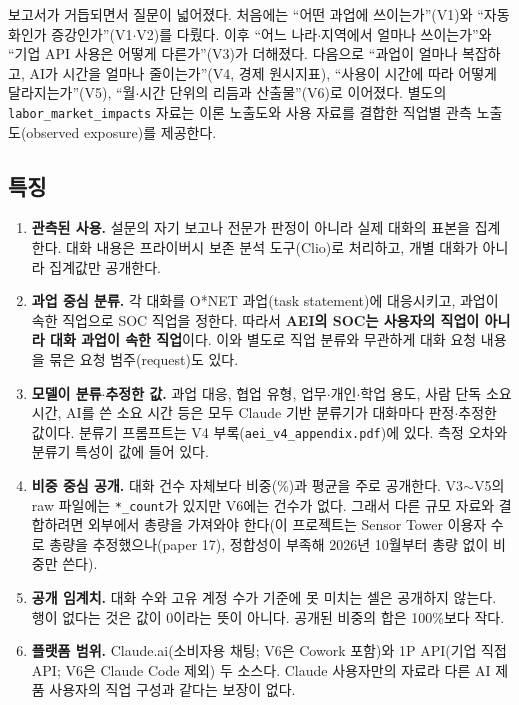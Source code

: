 \documentclass[11pt]{article}
\begin{document}
보고서가 거듭되면서 질문이 넓어졌다. 처음에는 ``어떤 과업에 쓰이는가''(V1)와 ``자동화인가 증강인가''(V1$\cdot$V2)를 다뤘다. 이후 ``어느 나라$\cdot$지역에서 얼마나 쓰이는가''와 ``기업 API 사용은 어떻게 다른가''(V3)\parencite{appel-2025-uneven-geographic-and-enterprise-ai}가 더해졌다. 다음으로 ``과업이 얼마나 복잡하고, AI가 시간을 얼마나 줄이는가''(V4, 경제 원시지표)\parencite{appel-2026-economic-primitives}, ``사용이 시간에 따라 어떻게 달라지는가''(V5)\parencite{massenkoff-2026-learning-curves}, ``월$\cdot$시간 단위의 리듬과 산출물''(V6)\parencite{massenkoff-2026-cadences}로 이어졌다. 별도의 \texttt{labor\_market\_impacts} 자료는 이론 노출도와 사용 자료를 결합한 직업별 관측 노출도(observed exposure)를 제공한다\parencite{massenkoff-2026-labor-market-impacts-of-ai}.

\subsection{특징}

\begin{enumerate}[leftmargin=*]
  \item \textbf{관측된 사용.} 설문의 자기 보고나 전문가 판정이 아니라 실제 대화의 표본을 집계한다. 대화 내용은 프라이버시 보존 분석 도구(Clio)로 처리하고, 개별 대화가 아니라 집계값만 공개한다.
  \item \textbf{과업 중심 분류.} 각 대화를 O*NET 과업(task statement)에 대응시키고, 과업이 속한 직업으로 SOC 직업을 정한다. 따라서 \textbf{AEI의 SOC는 사용자의 직업이 아니라 대화 과업이 속한 직업}이다. 이와 별도로 직업 분류와 무관하게 대화 요청 내용을 묶은 요청 범주(request)도 있다.
  \item \textbf{모델이 분류$\cdot$추정한 값.} 과업 대응, 협업 유형, 업무$\cdot$개인$\cdot$학업 용도, 사람 단독 소요 시간, AI를 쓴 소요 시간 등은 모두 Claude 기반 분류기가 대화마다 판정$\cdot$추정한 값이다. 분류기 프롬프트는 V4 부록(\texttt{aei\_v4\_appendix.pdf})에 있다. 측정 오차와 분류기 특성이 값에 들어 있다.
  \item \textbf{비중 중심 공개.} 대화 건수 자체보다 비중(\%)과 평균을 주로 공개한다. V3$\sim$V5의 raw 파일에는 \texttt{*\_count}가 있지만 V6에는 건수가 없다. 그래서 다른 규모 자료와 결합하려면 외부에서 총량을 가져와야 한다(이 프로젝트는 Sensor Tower 이용자 수로 총량을 추정했으나(paper 17), 정합성이 부족해 2026년 10월부터 총량 없이 비중만 쓴다).
  \item \textbf{공개 임계치.} 대화 수와 고유 계정 수가 기준에 못 미치는 셀은 공개하지 않는다. 행이 없다는 것은 값이 0이라는 뜻이 아니다. 공개된 비중의 합은 100\%보다 작다.
  \item \textbf{플랫폼 범위.} Claude.ai(소비자용 채팅; V6은 Cowork 포함)와 1P API(기업 직접 API; V6은 Claude Code 제외) 두 소스다. Claude 사용자만의 자료라 다른 AI 제품 사용자의 직업 구성과 같다는 보장이 없다.
\end{enumerate}
\end{document}

